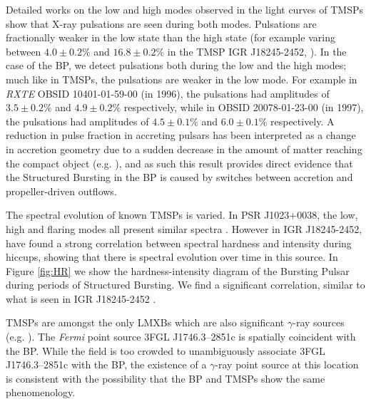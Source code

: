 \par  Detailed works on the low and high modes observed in the light curves of TMSPs show that X-ray pulsations are seen during both modes.  Pulsations are fractionally weaker in the low state than the high state (for example varing between $4.0\pm0.2\%$ and $16.8\pm0.2\%$ in the TMSP IGR J18245-2452, \citealp{Ferrigno_TMSPVar}).  In the case of the BP, we detect pulsations both during the low and the high modes; much like in TMSPs, the pulsations are weaker in the low mode.  For example in \textit{RXTE} OBSID 10401-01-59-00 (in 1996), the pulsations had amplitudes of $3.5\pm0.2\%$ and $4.9\pm0.2\%$ respectively, while in OBSID 20078-01-23-00 (in 1997), the pulsations had amplitudes of $4.5\pm0.1\%$ and $6.0\pm0.1\%$ respectively.  A reduction in pulse fraction in accreting pulsars has been interpreted as a change in accretion geometry due to a sudden decrease in the amount of matter reaching the compact object (e.g. \citealp{Ibragimov_PulseFrac}), and as such this result provides direct evidence that the Structured Bursting in the BP is caused by switches between accretion and propeller-driven outflows.

\par The spectral evolution of known TMSPs is varied.  In PSR J1023+0038, the low, high and flaring modes all present similar spectra \citep{Bogdanov_TMSPVar}.  However in IGR J18245-2452, \citealp{Ferrigno_TMSPVar} have found a strong correlation between spectral hardness and intensity during hiccups, showing that there is spectral evolution over time in this source.  In Figure \ref{fig:HR} we show the hardness-intensity diagram of the Bursting Pulsar during periods of Structured Bursting.  We find a significant correlation, similar to what is seen in IGR J18245-2452 \citep{Ferrigno_TMSPVar}.

\par TMSPs are amongst the only LMXBs which are also significant $\gamma$-ray sources (e.g. \citealp{Hill_XSS}).  The \textit{Fermi} point source 3FGL J1746.3--2851c is spatially coincident with the BP.  While the field is too crowded to unambiguously associate 3FGL J1746.3--2851c with the BP, the existence of a $\gamma$-ray point source at this location is consistent with the possibility that the BP and TMSPs show the same phenomenology.


